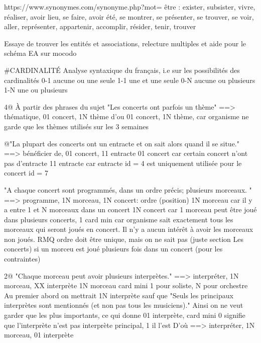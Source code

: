 \documentclass[12pt,a4paper]{article}
\begin{document}
{https://www.synonymes.com/synonyme.php?mot=%
être : 
exister, subsister, vivre, réaliser, avoir lieu, se faire, avoir été, se montrer, se présenter, se trouver, se voir, aller, représenter, appartenir, accomplir, résider, tenir, trouver



















Essaye de trouver les entités et associations, relecture multiples et aide pour le schéma EA sur mocodo



#CARDINALITÉ
Analyse syntaxique du français, i.e sur les possibilités des cardinalités
0-1     aucune ou une seule
1-1     une et une seule
0-N     aucune ou plusieurs
1-N     une ou plusieurs


4@ À partir des phrases du sujet
"Les concerts ont parfois un thème" ==> thématique, 01 concert, 1N thème
d'ou 01 concert,
1N thème, car organisme ne garde que les thèmes utilisés sur les 3 semaines


@"La plupart des concerts ont un entracte et on sait alors quand il se situe."
==> bénéficier de, 01 concert, 11 entracte
01 concert car certain concert n'ont pas d'entracte
11 entracte car entracte id = 4 est uniquement utilisée pour le concert id = 7


"A chaque concert sont programmés, dans un ordre précis; plusieurs morceaux. "
==> programme, 1N morceau, 1N concert: ordre (position)
1N morceau car il y a entre 1 et N morceaux dans un concert
1N concert car 1 morceau peut être joué dans plusieurs concerts, 1 card min car organisme sait exactement
tous les morceaux qui seront joués en concert. Il n'y a aucun intérêt à avoir les morceaux non joués.
RMQ ordre doit être unique, mais on ne sait pas (juste section Les concerts) si un morceu est joué plusieurs fois dans un concert (pour les contraintes)



2@ "Chaque morceau peut avoir plusieurs interprètes."
==> interpréter, 1N morceau, XX interprète
1N morceau card mini 1 pour soliste, N pour orchestre
Au premier abord on mettrait 1N interprète sauf que
"Seuls les principaux interprètes sont mentionnés (et non pas tous les musiciens)."
Ainsi on ne veut garder que les plus importants, ce qui donne
01 interprète, card mini 0 signifie que l'interprète n'est pas interprète principal, 1 il l'est
D'où ==> interpréter, 1N morceau, 01 interprète

}
\end{document}
